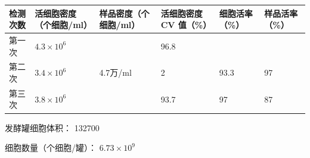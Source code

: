 \documentclass[UTF8,10pt,a4paper,fontset=fandol]{ctexart}
\newcommand{\fieldvalue}[1]{#1}
\newcommand{\handwritten}[1]{#1}
\begin{document}
\begin{center}
\small
\begin{tabular}{|p{1.35cm}|p{2.05cm}|p{2.05cm}|p{1.8cm}|p{1.55cm}|p{1.65cm}|}
\hline
检测次数 & 活细胞密度（个细胞/ml） & 样品密度（个细胞/ml） &
活细胞密度 CV 值（\%） & 细胞活率（\%） & 样品活率（\%）\\
\hline
第一次 &
\fieldvalue{\handwritten{$4.3\times10^{6}$}} &
 &
\fieldvalue{\handwritten{96.8}} &
 & \\
\hline
第二次 &
\fieldvalue{\handwritten{$3.4\times10^{6}$}} &
\fieldvalue{\handwritten{4.7万/ml}} &
\fieldvalue{\handwritten{2}} &
\fieldvalue{\handwritten{93.3}} &
\fieldvalue{\handwritten{97}} \\
\hline
第三次 &
\fieldvalue{\handwritten{$3.8\times10^{6}$}} &
 &
\fieldvalue{\handwritten{93.7}} &
\fieldvalue{\handwritten{97}} &
\fieldvalue{\handwritten{87}} \\
\hline
\end{tabular}
\end{center}

\noindent
发酵罐细胞体积：
\fieldvalue{\handwritten{132700}}

\medskip

\noindent
细胞数量（个细胞/罐）：
\fieldvalue{\handwritten{$6.73\times10^{9}$}}
\end{document}
